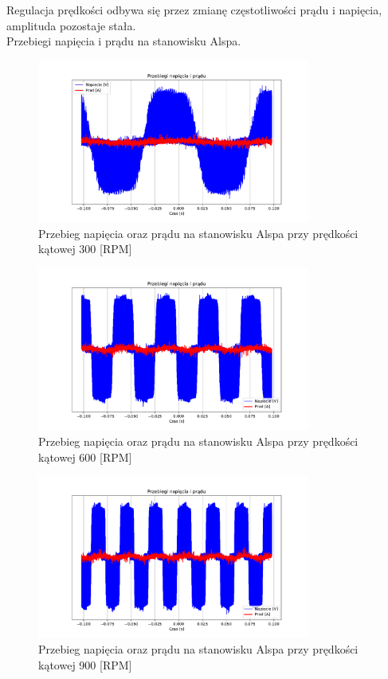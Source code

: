 \documentclass[11pt]{article}
\begin{document}
Regulacja prędkości odbywa się przez zmianę częstotliwości prądu i napięcia, amplituda pozostaje stała.\\

Przebiegi napięcia i prądu na stanowisku Alspa.\\

\begin{figure}[H]
\centering
\includegraphics[width=0.8\textwidth]{aun1_alspa_rpm300.pdf}
\caption{Przebieg napięcia oraz prądu na stanowisku Alspa przy prędkości kątowej 300 [RPM]}
\end{figure}

\begin{figure}[H]
\centering
\includegraphics[width=0.8\textwidth]{aun1_alspa_rpm600.pdf}
\caption{Przebieg napięcia oraz prądu na stanowisku Alspa przy prędkości kątowej 600 [RPM]}
\end{figure}

\begin{figure}[H]
\centering
\includegraphics[width=0.8\textwidth]{aun1_alspa_rpm900.pdf}
\caption{Przebieg napięcia oraz prądu na stanowisku Alspa przy prędkości kątowej 900 [RPM]}
\end{figure}
\end{document}

